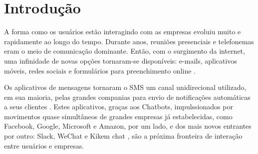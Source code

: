 \documentclass[quali]{mpit}
\begin{document}
 

\folhaderosto



\section{Introdução}

A forma como os usuários estão interagindo com as empresas evoluiu muito e rapidamente ao longo do tempo.
Durante anos, reuniões presenciais e telefonemas eram o meio de comunicação dominante. Então, com o surgimento da internet, uma infinidade de novas opções tornaram-se disponíveis: e-mails, aplicativos móveis, redes sociais e formulários para preenchimento online \cite{SalesforceDriftAudience2018TheReport}. 

Os aplicativos de mensagens tornaram o SMS um canal unidirecional utilizado, em sua maioria, pelas grandes companias para envio de notificações automáticas a seus clientes \cite{MobileTime2018MensageriaBrasil}
. Estes aplicativos, graças aos Chatbots, impulssionados por movimentos quase simultâneos de grandes empresas já estabelecidas, como Facebook, Google, Microsoft e Amazon, por um lado, e dos mais novos entrantes por outro: Slack, WeChat e Kikem chat \cite{MindBowser2017ChatbotSurvey}, são a próxima fronteira de interação entre usuários e empresas.

\end{document}
